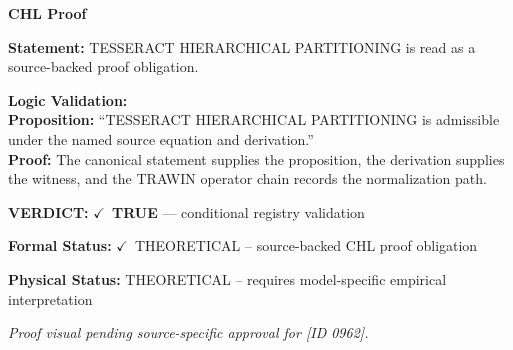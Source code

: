 \vspace{0.45em}
\noindent\textbf{CHL Proof}\par
\textbf{Statement:} TESSERACT HIERARCHICAL PARTITIONING is read as a source-backed proof obligation.

\textbf{Logic Validation:}\\
\textbf{Proposition:} ``TESSERACT HIERARCHICAL PARTITIONING is admissible under the named source equation and derivation.''\\
\textbf{Proof:} The canonical statement supplies the proposition, the derivation supplies the witness, and the TRAWIN operator chain records the normalization path.

\textbf{VERDICT:} \ensuremath{\checkmark}\ \textbf{TRUE} --- conditional registry validation

\textbf{Formal Status:} \ensuremath{\checkmark}\ THEORETICAL -- source-backed CHL proof obligation

\textbf{Physical Status:} THEORETICAL -- requires model-specific empirical interpretation
\par\vspace{0.45em}
\par
\vfill
\begingroup\footnotesize\itshape
Proof visual pending source-specific approval for [ID 0962].
\par\endgroup
\vfill
\endgroup
\endgroup
